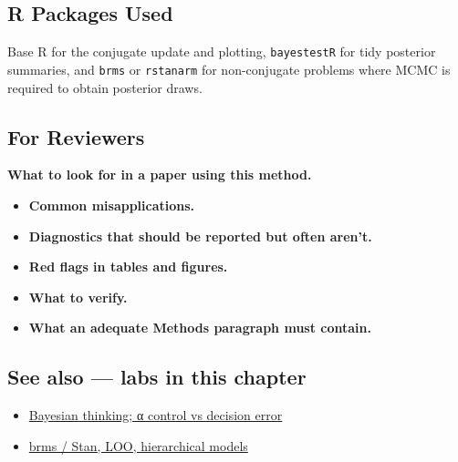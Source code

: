 \documentclass[
]{article}
\providecommand{\tightlist}{%
  \setlength{\itemsep}{0pt}\setlength{\parskip}{0pt}}
\begin{document}
\subsection{R Packages Used}\label{r-packages-used}

Base R for the conjugate update and plotting, \texttt{bayestestR} for
tidy posterior summaries, and \texttt{brms} or \texttt{rstanarm} for
non-conjugate problems where MCMC is required to obtain posterior draws.

\subsection{For Reviewers}\label{for-reviewers}

\textbf{What to look for in a paper using this method.}

\begin{itemize}
\tightlist
\item
  \textbf{Common misapplications.}
\item
  \textbf{Diagnostics that should be reported but often aren't.}
\item
  \textbf{Red flags in tables and figures.}
\item
  \textbf{What to verify.}
\item
  \textbf{What an adequate Methods paragraph must contain.}
\end{itemize}

\subsection{See also --- labs in this
chapter}\label{see-also-labs-in-this-chapter}

\begin{itemize}
\tightlist
\item
  \href{labs/lab-bayesian-thinking-control-vs-decision-error.Rmd}{Bayesian
  thinking; α control vs decision error}
\item
  \href{labs/lab-brms-stan-loo-hierarchical-models.Rmd}{brms / Stan,
  LOO, hierarchical models}
\end{itemize}
\end{document}
